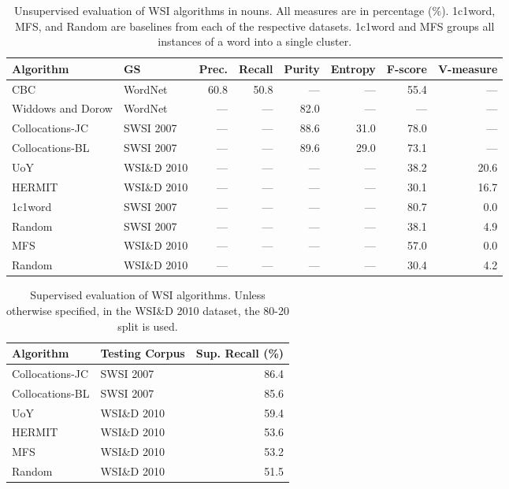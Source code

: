 \begin{table}[ht]
\caption[Unsupervised evaluation of \acl*{WSI} algorithms]
{Unsupervised evaluation of \ac{WSI} algorithms in nouns. All measures are in
percentage ($\%$). 1c1word, \ac{MFS}, and Random are baselines from each of the
respective datasets. 1c1word and \ac{MFS} groups all instances of a word into a
single cluster.}
\label{tab:uswsi}

\begin{tabu} to \textwidth { Xlrrrrrr }
\hline
\textbf{Algorithm} & \textbf{GS} & \textbf{Prec.} & \textbf{Recall} & \textbf{Purity} & \textbf{Entropy} & \textbf{F-score} & \textbf{V-measure} \\
\hline
CBC               & WordNet        & 60.8 & 50.8 & ---  & ---  & 55.4 & ---  \\
Widdows and Dorow & WordNet        & ---  & ---  & 82.0 & ---  & ---  & ---  \\
Collocations-JC   & \ac{SWSI} 2007 & ---  & ---  & 88.6 & 31.0 & 78.0 & ---  \\
Collocations-BL   & \ac{SWSI} 2007 & ---  & ---  & 89.6 & 29.0 & 73.1 & ---  \\
UoY     & WSI\&D 2010    & ---  & ---  & ---  & ---  & 38.2 & 20.6 \\
HERMIT  & WSI\&D 2010    & ---  & ---  & ---  & ---  & 30.1 & 16.7 \\
\hline
1c1word & \ac{SWSI} 2007 & ---  & ---  & ---  & ---  & 80.7 & 
0.0\footnotemark[1] \\
Random  & \ac{SWSI} 2007 & ---  & ---  & ---  & ---  & 38.1 & 
4.9\footnotemark[1] \\
MFS     & WSI\&D 2010    & ---  & ---  & ---  & ---  & 57.0 & 0.0  \\
Random  & WSI\&D 2010    & ---  & ---  & ---  & ---  & 30.4 & 4.2  \\
\hline
\end{tabu}
\end{table}


\begin{table}[ht]
\caption[Supervised evaluation of \acl*{WSI} algorithms]
{Supervised evaluation of \ac{WSI} algorithms. Unless otherwise specified, in
the WSI\&D 2010 dataset, the 80-20 split is used.}
\label{tab:wsi}

\begin{tabu} to \textwidth { XXr }
\hline
\textbf{Algorithm} & \textbf{Testing Corpus} & \textbf{Sup. Recall} (\%)\\
\hline
Collocations-JC           & \ac{SWSI} 2007 & 86.4 \\
Collocations-BL           & \ac{SWSI} 2007 & 85.6 \\
UoY            & WSI\&D 2010    & 59.4 \\
HERMIT           & WSI\&D 2010    & 53.6 \\
\hline
MFS           & WSI\&D 2010    & 53.2 \\
Random        & WSI\&D 2010    & 51.5 \\
\hline
\end{tabu}
\end{table}

